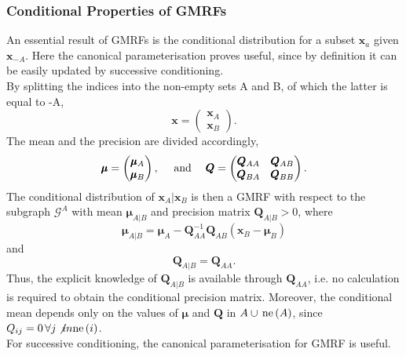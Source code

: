 \subsubsection{Conditional Properties of GMRFs}
An essential result of GMRFs is the conditional distribution for a subset $\pmb{x}_a$ given $\pmb{x}_{-A}$. Here the canonical parameterisation proves useful, since by definition it can be easily updated by successive conditioning. \\
By splitting the indices into the non-empty sets A and B, of which the latter is equal to -A,
\begin{equation}\label{eq:partition_1}
    \pmb{x}=\begin{pmatrix}\pmb{x}_A\\\pmb{x}_B\end{pmatrix}.
\end{equation}
The mean and the precision are divided accordingly,
\begin{equation}\label{eq:partition_2}
    \pmb{\mu}=\begin{pmatrix}\pmb{\mu}_A\\\pmb{\mu}_B\end{pmatrix},\hspace{10pt}\hbox{ and }\hspace{10pt}\pmb{Q}=\begin{pmatrix}\pmb{Q}_{AA} & \pmb{Q}_{AB} \\ \pmb{Q}_{BA} & \pmb{Q}_{BB}\end{pmatrix}.
\end{equation}
The conditional distribution of $\pmb{x}_A|\pmb{x}_B$ is then a GMRF with respect to the subgraph $\mathcal{G}^A$ with mean $\pmb{\mu}_{A|B}$ and precision matrix $\pmb{Q}_{A|B}>0$, where
\begin{equation}
    \pmb{\mu}_{A|B}=\pmb{\mu}_A-\pmb{Q}_{AA}^{-1}\pmb{Q}_{AB}\left(\pmb{x}_B-\pmb{\mu}_B\right)
\end{equation}
and
\begin{equation*}
    \pmb{Q}_{A|B}=\pmb{Q}_{AA}.
\end{equation*}
Thus, the explicit knowledge of $\pmb{Q}_{A|B}$ is available through $\pmb{Q}_{AA}$, i.e. no calculation is required to obtain the conditional precision matrix. Moreover, the conditional mean depends only on the values of $\pmb{\mu}$ and $\pmb{Q}$ in $A\cup\,\hbox{ne}\left(A\right)$, since $Q_{ij} = 0\,\forall j\not in\hbox{ne}\left(i\right)$. \\
For successive conditioning, the canonical parameterisation for GMRF is useful. \\
